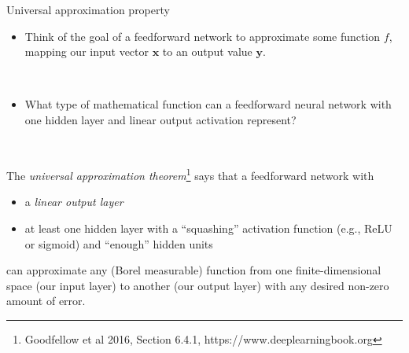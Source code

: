 \documentclass[
  10pt,
  ignorenonframetext,
]{beamer}
\providecommand{\tightlist}{%
  \setlength{\itemsep}{0pt}\setlength{\parskip}{0pt}}
\begin{document}
\begin{frame}
\begin{block}{Universal approximation property}
\protect\hypertarget{universal-approximation-property}{}
\(~\)

\begin{itemize}
\tightlist
\item
  Think of the goal of a feedforward network to approximate some
  function \(f\), mapping our input vector \({\boldsymbol x}\) to an
  output value \({\boldsymbol y}\).
\end{itemize}

\(~\)

\begin{itemize}
\tightlist
\item
  What type of mathematical function can a feedforward neural network
  with one hidden layer and linear output activation represent?
\end{itemize}

\(~\) \pause

The \emph{universal approximation
theorem}\footnote{Goodfellow et al 2016, Section 6.4.1, https://www.deeplearningbook.org}
says that a feedforward network with \vspace{2mm}

\begin{itemize}
\tightlist
\item
  a \emph{linear output layer}
\item
  at least one hidden layer with a ``squashing'' activation function
  (e.g., ReLU or sigmoid) and ``enough'' hidden units
\end{itemize}

\vspace{2mm}

can approximate any (Borel measurable) function from one
finite-dimensional space (our input layer) to another (our output layer)
with any desired non-zero amount of error.
\end{block}
\end{frame}
\end{document}
